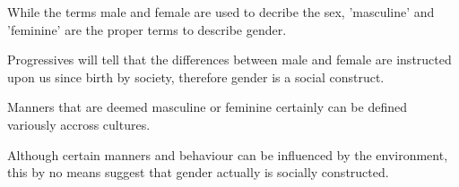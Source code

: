 \documentclass[12pt]{article}
\begin{document}
While the terms male and female are used to decribe the sex, 'masculine' and 'feminine' are the proper terms to describe gender.

Progressives will tell that the differences between male and female are instructed upon us since birth by society, therefore gender is a social construct.

Manners that are deemed masculine or feminine certainly can be defined variously accross cultures.
 
Although certain manners and behaviour can be influenced by the environment, this by no means suggest that gender actually is socially constructed. 





\end{document}
